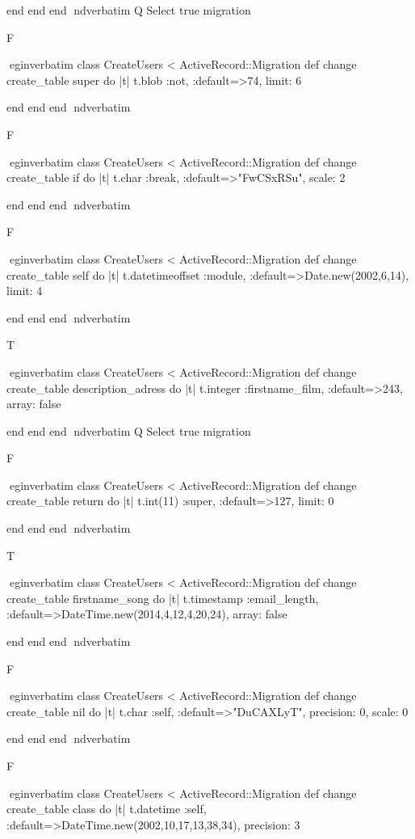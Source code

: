     end 
  end 
end
nd{verbatim}
Q
 Select true migration

F

egin{verbatim}
 class CreateUsers < ActiveRecord::Migration 
  def change 
    create_table super do |t| 
      t.blob :not, :default=>74, limit: 6
    
    end 
  end 
end
nd{verbatim}

F

egin{verbatim}
 class CreateUsers < ActiveRecord::Migration 
  def change 
    create_table if do |t| 
      t.char :break, :default=>"FwCSxRSu", scale: 2
    
    end 
  end 
end
nd{verbatim}

F

egin{verbatim}
 class CreateUsers < ActiveRecord::Migration 
  def change 
    create_table self do |t| 
      t.datetimeoffset :module, :default=>Date.new(2002,6,14), limit: 4
    
    end 
  end 
end
nd{verbatim}

T

egin{verbatim}
 class CreateUsers < ActiveRecord::Migration 
  def change 
    create_table description_adress do |t| 
      t.integer :firstname_film, :default=>243, array: false
    
    end 
  end 
end
nd{verbatim}
Q
 Select true migration

F

egin{verbatim}
 class CreateUsers < ActiveRecord::Migration 
  def change 
    create_table return do |t| 
      t.int(11) :super, :default=>127, limit: 0
    
    end 
  end 
end
nd{verbatim}

T

egin{verbatim}
 class CreateUsers < ActiveRecord::Migration 
  def change 
    create_table firstname_song do |t| 
      t.timestamp :email_length, :default=>DateTime.new(2014,4,12,4,20,24), array: false
    
    end 
  end 
end
nd{verbatim}

F

egin{verbatim}
 class CreateUsers < ActiveRecord::Migration 
  def change 
    create_table nil do |t| 
      t.char :self, :default=>"DuCAXLyT", precision: 0, scale: 0
    
    end 
  end 
end
nd{verbatim}

F

egin{verbatim}
 class CreateUsers < ActiveRecord::Migration 
  def change 
    create_table class do |t| 
      t.datetime :self, :default=>DateTime.new(2002,10,17,13,38,34), precision: 3
    
